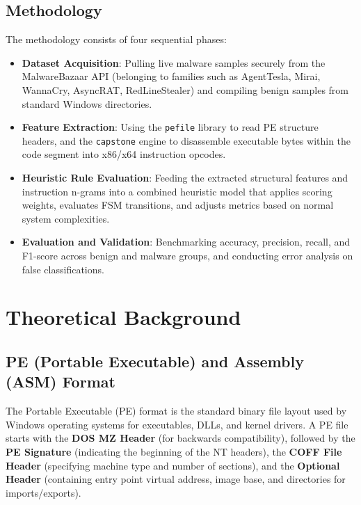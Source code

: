 \documentclass[11pt,a4paper]{article}
\begin{document}
\subsection{Methodology}
The methodology consists of four sequential phases:
\begin{itemize}
    \item \textbf{Dataset Acquisition}: Pulling live malware samples securely from the MalwareBazaar API (belonging to families such as AgentTesla, Mirai, WannaCry, AsyncRAT, RedLineStealer) and compiling benign samples from standard Windows directories.
    \item \textbf{Feature Extraction}: Using the \texttt{pefile} library to read PE structure headers, and the \texttt{capstone} engine to disassemble executable bytes within the code segment into x86/x64 instruction opcodes.
    \item \textbf{Heuristic Rule Evaluation}: Feeding the extracted structural features and instruction n-grams into a combined heuristic model that applies scoring weights, evaluates FSM transitions, and adjusts metrics based on normal system complexities.
    \item \textbf{Evaluation and Validation}: Benchmarking accuracy, precision, recall, and F1-score across benign and malware groups, and conducting error analysis on false classifications.

\end{itemize}

\newpage

\section{Theoretical Background}

\subsection{PE (Portable Executable) and Assembly (ASM) Format}
The Portable Executable (PE) format is the standard binary file layout used by Windows operating systems for executables, DLLs, and kernel drivers. A PE file starts with the \textbf{DOS MZ Header} (for backwards compatibility), followed by the \textbf{PE Signature} (indicating the beginning of the NT headers), the \textbf{COFF File Header} (specifying machine type and number of sections), and the \textbf{Optional Header} (containing entry point virtual address, image base, and directories for imports/exports). \\
\end{document}
